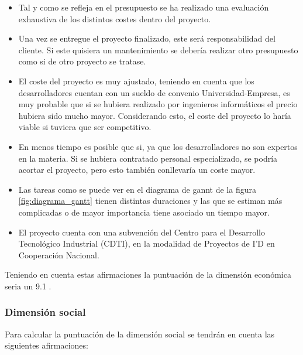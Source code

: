 \begin{itemize}
  \item Tal y como se refleja en el presupuesto se ha realizado una evaluación exhaustiva de los distintos costes dentro del proyecto.
  \item Una vez se entregue el proyecto finalizado, este será responsabilidad del cliente. Si este quisiera un mantenimiento se debería realizar otro presupuesto como si de otro proyecto se tratase.
  \item El coste del proyecto es muy ajustado, teniendo en cuenta que los desarrolladores cuentan con un sueldo de convenio Universidad-Empresa, es muy probable que si se hubiera realizado por ingenieros informáticos el precio hubiera sido mucho mayor. Considerando esto, el coste del proyecto lo haría viable si tuviera que ser competitivo.
  \item En menos tiempo es posible que si, ya que los desarrolladores no son expertos en la materia. Si se hubiera contratado personal especializado, se podría acortar el proyecto, pero esto también conllevaría un coste mayor.
  \item Las tareas como se puede ver en el diagrama de gannt de la figura \ref{fig:diagrama_gantt} tienen distintas duraciones y las que se estiman más complicadas o de mayor importancia tiene asociado un tiempo mayor.
  \item El proyecto cuenta con una subvención del Centro para el Desarrollo Tecnológico Industrial (CDTI), en la modalidad de Proyectos de I'D en Cooperación Nacional.
\end{itemize}

Teniendo en cuenta estas afirmaciones la puntuación de la dimensión económica seria un 9.1 .

\subsubsection{Dimensión social}
Para calcular la puntuación de la dimensión social se tendrán en cuenta las siguientes afirmaciones:

